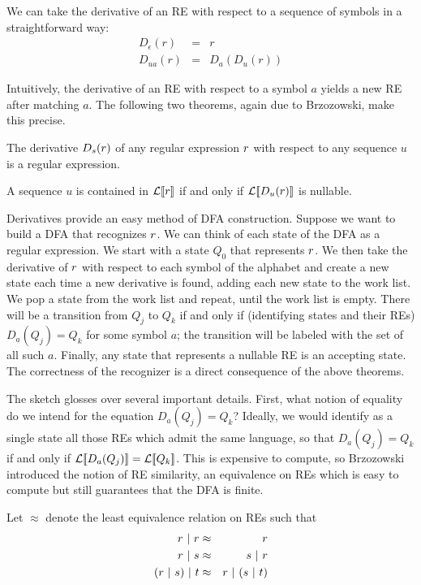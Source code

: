 We can take the derivative of an RE with respect to a sequence of symbols in a straightforward way:
\begin{eqnarray*}
D_\epsilon (r) &=& r \\
D_{ua} (r) &=& D_a(D_u(r))
\end{eqnarray*}

Intuitively, the derivative of an RE with respect to a symbol $a$ yields a new RE after matching $a$.  The following two theorems, again due to Brzozowski, make this precise.

\begin{theorem} The derivative $D_s(r)$ of any regular expression $r$ with respect to any sequence $u$ is a regular expression.
\end{theorem}

\begin{theorem} A sequence $u$ is contained in $\mathcal{L}[ \! [ r ] \! ]$ if and only if $\mathcal{L}[ \! [ D_u(r) ] \! ]$ is nullable.
\end{theorem}

Derivatives provide an easy method of DFA construction.  Suppose we want to build a DFA that recognizes $r$.  We can think of each state of the DFA as a regular expression.  We start with a state $Q_0$ that represents $r$.  We then take the derivative of $r$ with respect to each symbol of the alphabet and create a new state each time a new derivative is found, adding each new state to the work list.  We pop a state from the work list and repeat, until the work list is empty.  There will be a transition from $Q_j$ to $Q_k$ if and only if (identifying states and their REs) $D_a (Q_j) = Q_k$ for some symbol $a$; the transition will be labeled with the set of all such $a$.  Finally, any state that represents a nullable RE is an accepting state.  The correctness of the recognizer is a direct consequence of the above theorems.

The sketch glosses over several important details.  First, what notion of equality do we intend for the equation $D_a (Q_j) = Q_k$?  Ideally, we would identify as a single state all those REs which admit the same language, so that $D_a (Q_j) = Q_k$ if and only if $\mathcal{L}[ \! [ D_a (Q_j) ] \! ] = \mathcal{L}[ \! [ Q_k ] \! ]$.  This is expensive to compute, so Brzozowski introduced the notion of RE similarity, an equivalence on REs which is easy to compute but still guarantees that the DFA is finite.

Let $\approx$ denote the least equivalence relation on REs such that
\begin{eqnarray*}
r \ | \  r &\approx& r \\
r \ | \  s &\approx& s \ | \  r \\
(r \ | \  s) \ | \  t &\approx& r \ | \  (s \ | \  t)
\end{eqnarray*}

